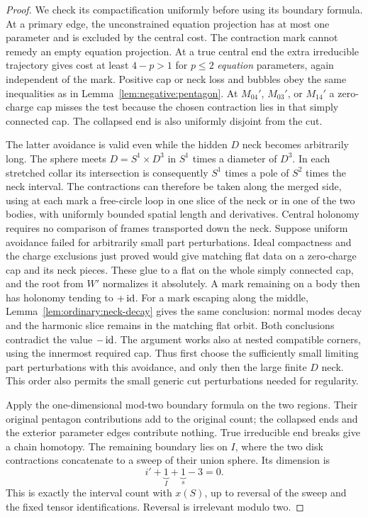 \begin{proof}
We check its compactification uniformly before using its boundary
formula.  At a primary edge, the unconstrained equation projection
has at most one parameter and is excluded by the central cost.
The contraction mark cannot remedy an empty equation projection.
At a true central end the extra irreducible trajectory gives cost
at least $4-p>1$ for $p\le2$ \emph{equation} parameters, again
independent of the mark.  Positive cap or neck loss and bubbles obey
the same inequalities as in Lemma~\ref{lem:negative:pentagon}.
At $M_{04}'$, $M_{03}'$, or $M_{14}'$ a zero-charge cap misses the
test because the chosen contraction lies in that simply connected
cap.  The collapsed end is also uniformly disjoint from the cut.

The latter avoidance is valid even while the hidden $D$ neck becomes
arbitrarily long.  The sphere meets $D=S^1\times D^3$ in $S^1$
times a diameter of $D^3$.  In each stretched collar its intersection
is consequently $S^1$ times a pole of $S^2$ times the neck interval.
The contractions can therefore be taken along the merged side, using
at each mark a free-circle loop in one slice of the neck or in one
of the two bodies, with uniformly bounded spatial length and
derivatives.  Central holonomy requires no comparison
of frames transported down the neck.  Suppose uniform avoidance
failed for arbitrarily small part perturbations.  Ideal compactness
and the charge exclusions just proved would give matching flat
data on a zero-charge cap and its neck pieces.  These glue to a
flat on the whole simply connected cap, and the root from $W'$
normalizes it absolutely.  A mark remaining on a body then has
holonomy tending to $+\operatorname{id}$.  For a mark escaping along the middle,
Lemma~\ref{lem:ordinary:neck-decay} gives the same conclusion:
normal modes decay and the harmonic slice remains in the matching
flat orbit.  Both conclusions contradict the value $-\operatorname{id}$.
The argument works also at nested compatible corners, using the
innermost required cap.  Thus first choose the sufficiently small
limiting part perturbations with this avoidance, and only then the
large finite $D$ neck.  This order also permits the small generic
cut perturbations needed for regularity.

Apply the one-dimensional mod-two boundary formula on the two
regions.  Their original pentagon contributions add to the original
count; the collapsed ends and the exterior parameter edges contribute
nothing.  True irreducible end breaks give a chain homotopy.  The
remaining boundary lies on $I$, where the two disk contractions
concatenate to a sweep of their union sphere.  Its dimension is
\[
 i'+\underbrace{1}_{I}+\underbrace{1}_{s}-3=0.
\]
This is exactly the interval count with $x(S)$, up to reversal of
the sweep and the fixed tensor identifications.  Reversal is
irrelevant modulo two.


\end{proof}

